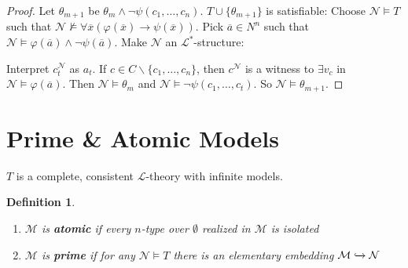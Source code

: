 \documentclass[]{article}
\theoremstyle{custhm}
\theoremstyle{cusdef}
\newtheorem{defin}[theorem]{Definition}
\theoremstyle{custhm}
\theoremstyle{custhm}
\theoremstyle{custhm}
\theoremstyle{ex}
\theoremstyle{custhm}
\theoremstyle{cusdef}
\theoremstyle{remark}
\theoremstyle{remark}
\theoremstyle{numremark}
\newcommand{\ra}{\rightarrow}
\newcommand{\undf}[1]{\textit{\textbf{#1}}}
\renewcommand{\L}{\mathcal{L}}
\newcommand{\M}{\mathcal{M}}
\renewcommand{\phi}{\varphi}
\renewcommand{\bar}{\overline}
\newcommand{\N}{\mathcal{N}}
\begin{document}
\begin{proof}
Let $\theta_{m+1}$ be $\theta_m\land \neg\psi(c_1,\dots,c_n)$. $T\cup\{\theta_{m+1}\}$ is satisfiable: Choose $\N\models T$ such that $\N\not\models \forall \bar{x}(\phi(\bar{x})\ra\psi(\bar{x}))$. Pick $\bar{a}\in N^n$ such that $\N\models \phi(\bar{a})\land \neg\psi(\bar{a})$. Make $\N$ an $\L^\ast$-structure:

Interpret $c_t^\N$ as $a_t$. If $c\in C\backslash\{c_1,\dots,c_n\}$, then $c^\N$ is a witness to $\exists v_c$ in $\N\models \phi(\bar{a})$. Then $\N\models \theta_m$ and $\N\models \neg\psi(c_1,\dots,c_t)$. So $\N\models \theta_{m+1}$.
\end{proof}

\section{Prime \& Atomic Models}

$T$ is a complete, consistent $\L$-theory with infinite models.

\begin{defin}\ 
\begin{enumerate}[label=\arabic*)]
	\item $\M$ is \undf{atomic} if every $n$-type over $\emptyset$ realized in $\M$ is isolated
	\item $\M$ is \undf{prime} if for any $\N\models T$ there is an elementary embedding $\M\xhookrightarrow{}\N$
\end{enumerate}
\end{defin}
\end{document}
